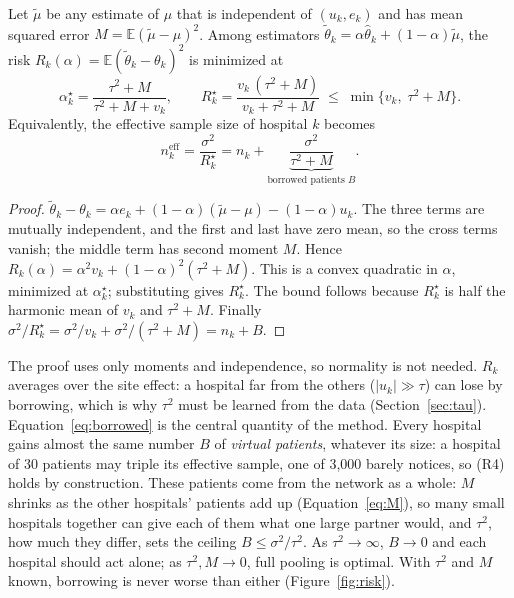 \documentclass[acmsmall,screen,review]{acmart}
\newcommand{\eff}{\mathrm{eff}}
\theoremstyle{acmdefinition}
\begin{document}
\begin{proposition}\label{prop:borrowing}
Let $\tilde{\mu}$ be any estimate of $\mu$ that is independent of $(u_k,e_k)$ and has mean squared error $M=\mathbb{E}(\tilde{\mu}-\mu)^2$. Among estimators $\tilde{\theta}_k=\alpha\hat{\theta}_k+(1-\alpha)\tilde{\mu}$, the risk $R_k(\alpha)=\mathbb{E}(\tilde{\theta}_k-\theta_k)^2$ is minimized at
\[
\alpha_k^{\star}=\frac{\tau^2+M}{\tau^2+M+v_k},\qquad R_k^{\star}=\frac{v_k\,(\tau^2+M)}{v_k+\tau^2+M}\;\le\;\min\{v_k,\;\tau^2+M\}.
\]
Equivalently, the effective sample size of hospital $k$ becomes
\begin{equation}\label{eq:borrowed}
n_k^{\eff}=\frac{\sigma^2}{R_k^{\star}}=n_k+\underbrace{\frac{\sigma^2}{\tau^2+M}}_{\text{borrowed patients }B}.
\end{equation}
\end{proposition}
\begin{proof}
$\tilde{\theta}_k-\theta_k=\alpha e_k+(1-\alpha)(\tilde{\mu}-\mu)-(1-\alpha)u_k$. The three terms are mutually independent, and the first and last have zero mean, so the cross terms vanish; the middle term has second moment $M$. Hence $R_k(\alpha)=\alpha^2 v_k+(1-\alpha)^2(\tau^2+M)$. This is a convex quadratic in $\alpha$, minimized at $\alpha_k^{\star}$; substituting gives $R_k^{\star}$. The bound follows because $R_k^{\star}$ is half the harmonic mean of $v_k$ and $\tau^2+M$. Finally $\sigma^2/R_k^{\star}=\sigma^2/v_k+\sigma^2/(\tau^2+M)=n_k+B$.
\end{proof}

The proof uses only moments and independence, so normality is not needed. $R_k$ averages over the site effect: a hospital far from the others ($|u_k|\gg\tau$) can lose by borrowing, which is why $\tau^2$ must be learned from the data (Section~\ref{sec:tau}). Equation~\eqref{eq:borrowed} is the central quantity of the method. Every hospital gains almost the same number $B$ of \emph{virtual patients}, whatever its size: a hospital of 30 patients may triple its effective sample, one of 3,000 barely notices, so (R4) holds by construction. These patients come from the network as a whole: $M$ shrinks as the other hospitals' patients add up (Equation~\eqref{eq:M}), so many small hospitals together can give each of them what one large partner would, and $\tau^2$, how much they differ, sets the ceiling $B\le\sigma^2/\tau^2$. As $\tau^2\to\infty$, $B\to0$ and each hospital should act alone; as $\tau^2,M\to0$, full pooling is optimal. With $\tau^2$ and $M$ known, borrowing is never worse than either (Figure~\ref{fig:risk}).
\end{document}
